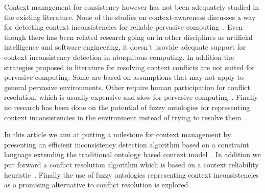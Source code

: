 \documentclass[journal]{vgtc}                %
\begin{document}
Context management for consistency however has not been adequately studied in the existing literature. None of the studies on context-awareness discusses a way for detecting context inconsistencies for reliable pervasive computing~\cite{xu:2010:PCC, bu:2006:CCM}. Even though there has been related research going on in other disciplines as artificial intelligence and software engineering, it doesn't provide adequate support for context inconsistency detection in ubuquitous computing. In addition the strategies proposed in literature for resolving context conflicts are not suited for pervasive computing. Some are based on assumptions that may not apply to general pervasive environments. Other require human participation for conflict resolution, which is usually expensive and slow for pervasive computing~\cite{xu:2010:PCC}. Finally no research has been done on the potential of fuzzy ontologies for representing context inconsistencies in the environment instead of trying to resolve them~\cite{ko:2009:IOFO}.

In this article we aim at putting a milestone for context management by presenting an efficient inconsistency detection algorithm based on a constraint language extending the traditional ontology based context model~\cite{xu:2010:PCC}. In addition we put forward a conflict resolution algorithm which is based on a context reliability heuristic~\cite{bu:2006:CCM}. Finally the use of fuzzy ontologies representing context inconsistencies as a promising alternative to conflict resolution is explored.
\end{document}
